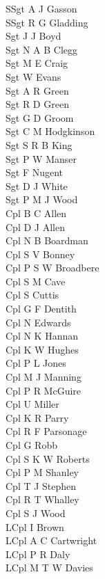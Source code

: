 \begin{multicols}{4}
  \scriptsize
  \noindent
  SSgt A J Gasson \\
  SSgt R G Gladding \\
  Sgt J J Boyd \\
  Sgt N A B Clegg \\
  Sgt M E Craig \\
  Sgt W Evans \\
  Sgt A R Green \\
  Sgt R D Green \\
  Sgt G D Groom \\
  Sgt C M Hodgkinson \\
  Sgt S R B King \\
  Sgt P W Manser \\
  Sgt F Nugent \\
  Sgt D J White \\
  Sgt P M J Wood \\
  Cpl B C Allen \\
  Cpl D J Allen \\
  Cpl N B Boardman \\
  Cpl S V Bonney \\
  Cpl P S W Broadbere \\
  Cpl S M Cave \\
  Cpl S Cuttis \\
  Cpl G F Dentith \\
  Cpl N Edwards \\
  Cpl N K Hannan \\
  Cpl K W Hughes \\
  Cpl P L Jones \\
  Cpl M J Manning \\
  Cpl P R McGuire \\
  Cpl U Miller \\
  Cpl K R Parry \\
  Cpl R F Parsonage \\
  Cpl G Robb \\
  Cpl S K W Roberts \\
  Cpl P M Shanley \\
  Cpl T J Stephen \\
  Cpl R T Whalley \\
  Cpl S J Wood \\
  LCpl I Brown \\
  LCpl A C Cartwright \\
  LCpl P R Daly \\
  LCpl M T W Davies \\

\end{multicols}

